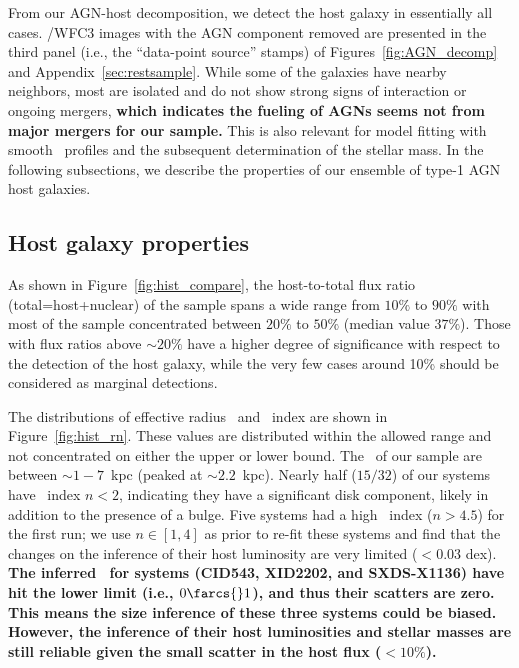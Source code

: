 \documentclass[apj]{emulateapj}
\begin{document}
From our AGN-host decomposition, we detect the host galaxy in essentially all cases. \hst/WFC3 images with the AGN component removed are presented in the third panel (i.e., the ``data-point source'' stamps) of Figures~\ref{fig:AGN_decomp} and Appendix~\ref{sec:restsample}. While some of the galaxies have nearby neighbors, most are isolated and do not show strong signs of interaction or ongoing mergers, {\bf which indicates the fueling of AGNs seems not from major mergers for our sample.} This is also relevant for model fitting with smooth \sersic\ profiles and the subsequent determination of the stellar mass. In the following subsections, we describe the properties of our ensemble of type-1 AGN host galaxies.
 
\subsection{Host galaxy properties}
\label{sec:result-hosts}
As shown in Figure~\ref{fig:hist_compare}, the host-to-total flux ratio (total=host+nuclear) of the sample spans a wide range from $10\%$ to $90\%$ with most of the sample concentrated between $20\%$ to $50\%$ (median value $37\%$). Those with flux ratios above $\sim20\%$ have a higher degree of significance with respect to the detection of the host galaxy, while the very few cases around 10\% should be considered as marginal detections. 

The distributions of effective radius \Reff\ and \sersic\ index are shown in Figure~\ref{fig:hist_rn}. These values are distributed within the allowed range and not concentrated on either the upper or lower bound. The \Reff\ of our sample are between $\sim1-7$~kpc (peaked at $\sim2.2$~kpc). Nearly half ($15/32$) of our systems have \sersic\ index $n<2$, indicating they have a significant disk component, likely in addition to the presence of a bulge. Five systems had a high \sersic\ index ($n>4.5$) for the first run; we use $n\in[1,4]$ as prior to re-fit these systems and find that the changes on the inference of their host luminosity are very limited ($<0.03$ dex). {\bf The inferred \Reff\ for systems (CID543, XID2202, and SXDS-X1136) have hit the lower limit (i.e., $0\farcs{}1$), and thus their scatters are zero. This means the size inference of these three systems could be biased. However, the inference of their host luminosities and stellar masses are still reliable given the small scatter in the host flux ($<10\%$).}
\end{document}
